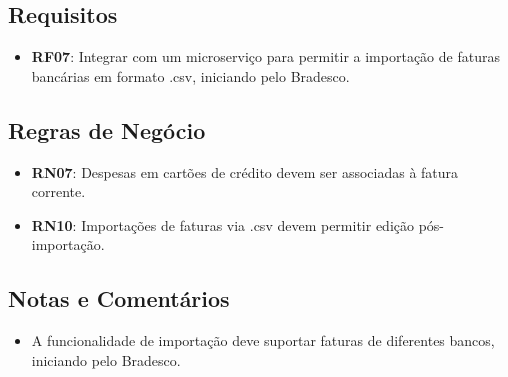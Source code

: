 \subsection*{Requisitos}
\begin{addmargin}[1.5cm]{0cm}
	\begin{itemize}
        \item \textbf{RF07}: Integrar com um microserviço para permitir a importação de faturas bancárias em formato .csv, iniciando pelo Bradesco.
	\end{itemize}
\end{addmargin}

\subsection*{Regras de Negócio}
\begin{addmargin}[1.5cm]{0cm}
    \begin{itemize}
        \item \textbf{RN07}: Despesas em cartões de crédito devem ser associadas à fatura corrente.
        \item \textbf{RN10}: Importações de faturas via .csv devem permitir edição pós-importação.
    \end{itemize}
\end{addmargin}

\subsection*{Notas e Comentários}
\begin{addmargin}[1.5cm]{0cm}
    \begin{itemize}
        \item A funcionalidade de importação deve suportar faturas de diferentes bancos, iniciando pelo Bradesco.
    \end{itemize}
\end{addmargin}
